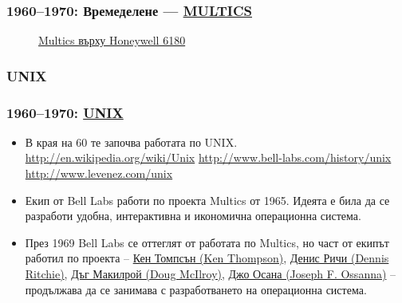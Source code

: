 \documentclass[ignorenonframetext, hyperref=unicode]{beamer}
\begin{document}
\begin{frame}
\frametitle{1960--1970: Времеделене --- \href{http://en.wikipedia.org/wiki/Multics}{MULTICS}}
\begin{figure}
\center
{}
\caption{\href{http://www.multicians.org/}{Multics върху Honeywell 6180}}
\end{figure}    
\end{frame}

\subsubsection{UNIX}

\begin{frame}
\frametitle{1960--1970: \href{http://en.wikipedia.org/wiki/Unix}{UNIX}}
\begin{itemize}
  \item В края на 60 те  започва работата по UNIX.
    \url{http://en.wikipedia.org/wiki/Unix}
	\url{http://www.bell-labs.com/history/unix}
    \url{http://www.levenez.com/unix}
  \item Екип от Bell Labs работи по проекта Multics от 1965. Идеята е била да се
  разработи удобна, интерактивна и икономична операционна система.
  \item През 1969 Bell Labs се оттеглят от работата по Multics, но част от екипът
  работил по проекта -- 
  \href{http://en.wikipedia.org/wiki/Ken_Thompson}{Кен Томпсън (Ken Thompson)},
  \href{http://en.wikipedia.org/wiki/Dennis_Ritchie}{Денис Ричи (Dennis Ritchie)},  
  \href{http://en.wikipedia.org/wiki/Doug_McIlroy}{Дъг Макилрой (Doug McIlroy)},
  \href{http://en.wikipedia.org/wiki/Joe_Ossanna}{Джо Осана (Joseph F. Ossanna)}
  -- продължава да се занимава с разработването на операционна система.
\end{itemize}
\end{frame}
    
\end{document}
